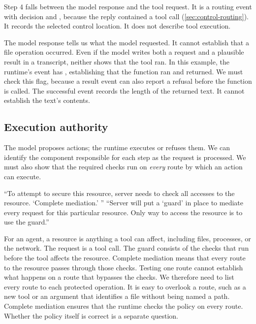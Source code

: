 Step 4 falls between the model response and the tool request. It is a routing event with decision
 and , because the reply contained a tool call
(\cref{sec:control-routing}). It records the selected control location. It does not describe tool
execution.

The model response tells us what the model requested. It cannot establish that a file operation
occurred. Even if the model writes both a request and a plausible result in a transcript, neither
shows that the tool ran. In this example, the runtime's  event has
, establishing that the function ran and returned. We must check this flag,
because a result event can also report a refusal before the function is called. The successful
event records the length of the returned text. It cannot establish the text's contents.

\subsection{Execution authority}
\label{sec:boundary-authority}

The model proposes actions; the runtime executes or refuses them. We can identify the component
responsible for each step as the request is processed. We must also show that the required checks
run on \emph{every} route by which an action can execute.

\begin{definition}
\label{def:complete-mediation}
``To attempt to secure this resource, server needs to check all accesses to the resource.
`Complete mediation.' '' ``Server will put a `guard' in place to mediate every request for this
particular resource. Only way to access the resource is to use the guard.''~\citep[\S5]{mit6033-lec20}
\end{definition}

For an agent, a resource is anything a tool can affect, including files, processes, or the network.
The request is a tool call. The guard consists of the checks that run before the tool affects the
resource. Complete mediation means that every route to the resource passes through those checks.
Testing one route cannot establish what happens on a route that bypasses the checks. We therefore
need to list every route to each protected operation. It is easy to overlook a route, such as a
new tool or an argument that identifies a file without being named a path. Complete mediation
ensures that the runtime checks the policy on every route. Whether the policy itself is correct
is a separate question.

